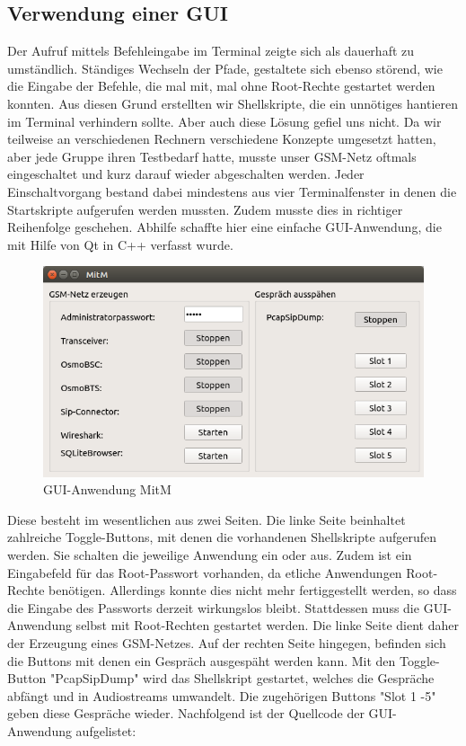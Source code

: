 
\subsection{Verwendung einer GUI}

Der Aufruf mittels Befehleingabe im Terminal zeigte sich als dauerhaft zu umständlich. Ständiges Wechseln der Pfade, gestaltete sich ebenso störend, wie die Eingabe der Befehle, die mal mit, mal ohne Root-Rechte gestartet werden konnten. Aus diesen Grund erstellten wir Shellskripte, die ein unnötiges hantieren im Terminal verhindern sollte. Aber auch diese Lösung gefiel uns nicht. Da wir teilweise an verschiedenen Rechnern verschiedene Konzepte umgesetzt hatten, aber jede Gruppe ihren Testbedarf hatte, musste unser GSM-Netz oftmals eingeschaltet und kurz darauf wieder abgeschalten werden. Jeder Einschaltvorgang bestand dabei mindestens aus vier Terminalfenster in denen die Startskripte aufgerufen werden mussten. Zudem musste dies in richtiger Reihenfolge geschehen. Abhilfe schaffte hier eine einfache GUI-Anwendung, die mit Hilfe von Qt in C++ verfasst wurde.  

\begin{figure}[h] %
\centering
\includegraphics[width=15cm]{includes/gui}
\caption{GUI-Anwendung MitM}
\label{fig:GUI}
\end{figure}


Diese besteht im wesentlichen aus zwei Seiten. Die linke Seite beinhaltet zahlreiche Toggle-Buttons, mit denen die vorhandenen Shellskripte aufgerufen werden. Sie schalten die jeweilige Anwendung ein oder aus. Zudem ist ein Eingabefeld für das Root-Passwort vorhanden, da etliche Anwendungen Root-Rechte benötigen. Allerdings konnte dies nicht mehr fertiggestellt werden, so dass die Eingabe des Passworts derzeit wirkungslos bleibt. Stattdessen muss die GUI-Anwendung selbst mit Root-Rechten gestartet werden. Die linke Seite dient daher der Erzeugung eines GSM-Netzes. 
Auf der rechten Seite hingegen, befinden sich die Buttons mit denen ein Gespräch ausgespäht werden kann. Mit den Toggle-Button "PcapSipDump" wird das Shellskript gestartet, welches die Gespräche abfängt und in Audiostreams umwandelt. Die zugehörigen Buttons "Slot 1 -5" geben diese Gespräche wieder. 
Nachfolgend ist der Quellcode der GUI-Anwendung aufgelistet:
\vspace{1cm}

